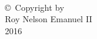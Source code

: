 
\thispagestyle{empty}
\hbox{\ }

\vfill
\renewcommand{\baselinestretch}{1}
\small\normalsize

\vspace{-.65in}

\begin{center}
\large{\copyright \hbox{ }Copyright by\\
Roy Nelson Emanuel II  %
\\
2016}
\end{center}

\vfill
